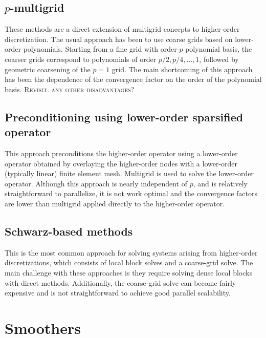 \documentclass[times]{nlaauth}
\begin{document}


\subsection{$p$-multigrid}
These methods are a direct extension of multigrid concepts to
higher-order discretization. The usual approach has been to use coarse
grids based on lower-order polynomials. Starting from a fine grid with
order-$p$ polynomial basis, the coarser grids correspond to
polynomials of order $p/2, p/4,\ldots,1$, followed by geometric
coarsening of the $p=1$ grid. The main shortcoming of this approach
has been the dependence of the convergence factor on the order of the
polynomial basis. \textsc{Revisit. any other disadvantages}?


\subsection{Preconditioning using lower-order sparsified operator}
This approach preconditions the higher-order operator using a
lower-order operator obtained by overlaying the higher-order nodes
with a lower-order (typically linear) finite element mesh. Multigrid
is used to solve the lower-order operator. Although this approach is
nearly independent of $p$, and is relatively straightforward to
parallelize, it is not work optimal and the convergence factors are
lower than multigrid applied directly to the higher-order operator.

\subsection{Schwarz-based methods}
This is the most common approach for solving systems arising from
higher-order discretizations, which consists of local block solves and
a coarse-grid solve. The main challenge with these approaches is they
require solving dense local blocks with direct methods. Additionally,
the coarse-grid solve can become fairly expensive and is not
straightforward to achieve good parallel scalability.


\section{Smoothers}
\end{document}

